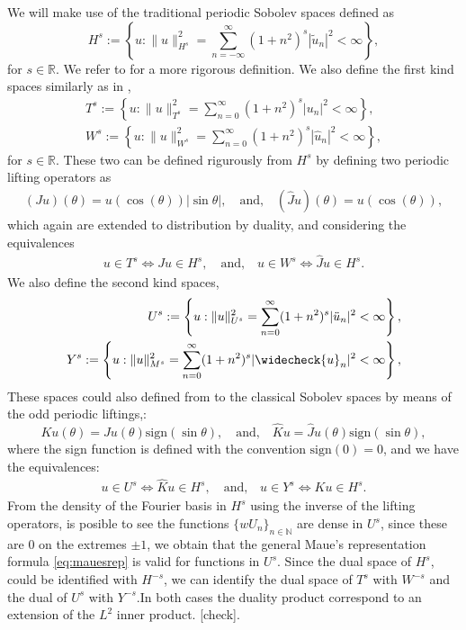 \documentclass{article}
\newcommand{\todo}[1]{{\color{red}[#1]}}
\newcommand{\IN}{{\mathbb N}}
\newcommand{\IR}{{\mathbb R}}
\begin{document}
We will make use of the traditional periodic Sobolev spaces defined as 
$$
H^s := \left\lbrace u : \| u\|_{H^s}^2 = \sum_{n=-\infty}^\infty (1+n^2)^s |\widetilde{u}_n|^2 < \infty \right\rbrace,
$$
for $s\in \IR$. We refer to \cite[Chapter 5]{saranen2013periodic} for a more rigorous definition. We also define the first kind spaces similarly as in \cite{Averseng2019},
\begin{align*}
T^s := \left\lbrace u : \| u\|_{T^s}^2 = \sum_{n=0}^\infty (1+n^2)^s |{u}_n|^2 < \infty \right\rbrace, \\
W^s := \left\lbrace u : \| u\|_{W^s}^2 = \sum_{n=0}^\infty (1+n^2)^s |\widehat{u}_n|^2 < \infty \right\rbrace,
\end{align*} 
for $s \in \IR$. These two can be defined rigurously from $H^s$ by defining two periodic lifting operators  as 
\begin{align}
\label{eq:liffings}
(Ju) (\theta) = u(\cos(\theta)) | \sin \theta|, \quad \text{and,} \quad
(\widehat{J}u)(\theta) = u (\cos(\theta)),
\end{align}
which again are extended to distribution by duality, and considering the equivalences 
\begin{align*}
u \in T^s \Leftrightarrow Ju \in H^s, \quad \text{and,} \quad u \in W^s \Leftrightarrow \widehat{J}u \in H^s.
\end{align*}
We also define the second kind spaces, 
\begin{align*}
U^s := \left\lbrace u : \| u\|_{U^s}^2 = \sum_{n=0}^\infty (1+n^2)^s |\ddot{u}_n|^2 < \infty \right\rbrace, \\
Y^s := \left\lbrace u : \| {u}\|_{M^s}^2 = \sum_{n=0}^\infty (1+n^2)^s |\widecheck{u}_n|^2 < \infty \right\rbrace,
\end{align*} 
These spaces could also defined from to the classical Sobolev spaces by means of the odd periodic liftings,:
$$
Ku(\theta) = Ju(\theta) \text{sign}(\sin\theta), \quad \text{and,}\quad \widehat{K}u = \widehat{J}u(\theta) \text{sign}(\sin\theta),
$$
where the sign function is defined with the convention $\text{sign}(0)=0$, and we have the equivalences: 
\begin{align*}
u \in U^s \Leftrightarrow \widehat{K}u \in H^s, \quad \text{and,} \quad u \in Y^s \Leftrightarrow Ku \in H^s.
\end{align*}
From the density of the Fourier basis in $H^s$ using the inverse of the lifting operators, is posible to see the functions $\{wU_n\}_{n \in \IN}$ are dense in $U^s$, since these are $0$
on the extremes $\pm 1$, we obtain that the general Maue's representation formula \eqref{eq:mauesrep} is valid for functions in $U^s$.  
Since the dual space of $H^s$, could be identified with $H^{-s}$, we can identify the dual space of $T^s$ with $W^{-s}$ and the dual of $U^s$ with $Y^{-s}$.In both cases the duality product correspond to an extension of the $L^2$ inner product. \todo{check}.
\end{document}
